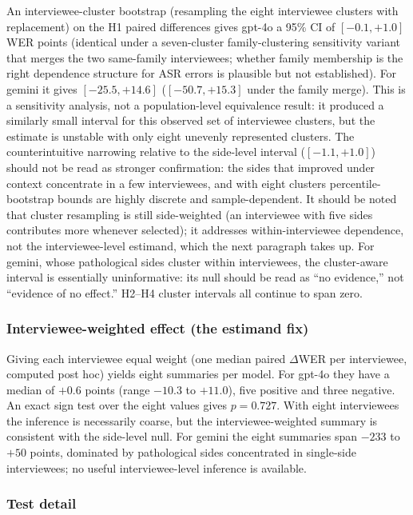 \documentclass[11pt]{article}
\begin{document}
An interviewee-cluster bootstrap (resampling the eight interviewee clusters with replacement) on the H1 paired differences gives gpt-4o a 95\% CI of $[-0.1, +1.0]$ WER points (identical under a seven-cluster family-clustering sensitivity variant that merges the two same-family interviewees; whether family membership is the right dependence structure for ASR errors is plausible but not established). For gemini it gives $[-25.5, +14.6]$ ($[-50.7, +15.3]$ under the family merge). This is a sensitivity analysis, not a population-level equivalence result: it produced a similarly small interval for this observed set of interviewee clusters, but the estimate is unstable with only eight unevenly represented clusters. The counterintuitive narrowing relative to the side-level interval ($[-1.1, +1.0]$) should not be read as stronger confirmation: the sides that improved under context concentrate in a few interviewees, and with eight clusters percentile-bootstrap bounds are highly discrete and sample-dependent. It should be noted that cluster resampling is still side-weighted (an interviewee with five sides contributes more whenever selected); it addresses within-interviewee dependence, not the interviewee-level estimand, which the next paragraph takes up. For gemini, whose pathological sides cluster within interviewees, the cluster-aware interval is essentially uninformative: its null should be read as ``no evidence,'' not ``evidence of no effect.'' H2--H4 cluster intervals all continue to span zero.

\subsubsection*{Interviewee-weighted effect (the estimand fix)}

Giving each interviewee equal weight (one median paired $\Delta$WER per interviewee, computed post hoc) yields eight summaries per model. For gpt-4o they have a median of $+0.6$ points (range $-10.3$ to $+11.0$), five positive and three negative. An exact sign test over the eight values gives $p = 0.727$. With eight interviewees the inference is necessarily coarse, but the interviewee-weighted summary is consistent with the side-level null. For gemini the eight summaries span $-233$ to $+50$ points, dominated by pathological sides concentrated in single-side interviewees; no useful interviewee-level inference is available.

\subsubsection*{Test detail}
\end{document}
